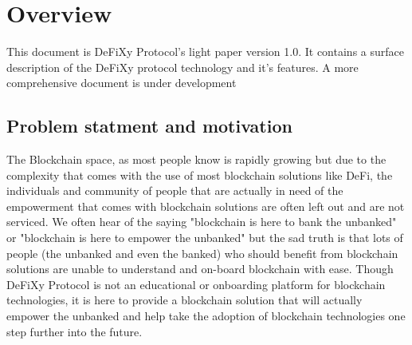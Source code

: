\documentclass[12pt,onecolumn,letterpaper]{article} %
\begin{document}
\section{Overview}
This document is DeFiXy Protocol's light paper version 1.0. It contains a surface description of the DeFiXy protocol technology and it's features. A more comprehensive document is under development
\subsection{Problem statment and motivation}
The Blockchain space, as most people know is rapidly growing but due to the complexity that comes with the use of most blockchain solutions like DeFi, the individuals and community of people that are actually in need of the empowerment that comes with blockchain solutions are often left out and are not serviced. We often hear of the saying "blockchain is here to bank the unbanked" or "blockchain is here to empower the unbanked" but the sad truth is that lots of people (the unbanked and even the banked) who should benefit from blockchain solutions are unable to understand and on-board blockchain with ease. Though DeFiXy Protocol is not an educational or onboarding platform for blockchain technologies, it is here to provide a blockchain solution that will actually empower the unbanked and help take the adoption of blockchain technologies one step further into the future.
\end{document}
